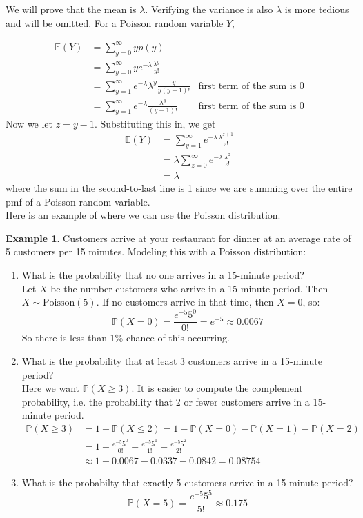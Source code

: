 \documentclass[12pt]{article}
\theoremstyle{definition}
\newtheorem*{example}{Example}
\theoremstyle{remark}
\def\P{{\mathbb P}}
\def\E{{\mathbb E}}
\begin{document}
We will prove that the mean is $\lambda$. Verifying the variance is also $\lambda$ is more tedious and will be omitted. For a Poisson random variable $Y$,

\begin{align*}
\E(Y) &= \sum_{y=0}^\infty y p(y) \\
&= \sum_{y=0}^\infty y e^{-\lambda}\frac{\lambda^y}{y!} \\
&= \sum_{y=1}^\infty e^{-\lambda}\lambda^y\frac{y}{y(y-1)!} & \text{first term of the sum is 0} \\
&= \sum_{y=1}^\infty e^{-\lambda} \frac{\lambda^y}{(y-1)!} & \text{first term of the sum is 0}
\end{align*}
Now we let $z = y - 1$. Substituting this in, we get
\begin{align*}
\E(Y) &= \sum_{y=1}^\infty e^{-\lambda} \frac{\lambda^{z+1}}{z!}\\
&= \lambda \sum_{z=0}^\infty e^{-\lambda} \frac{\lambda^{z}}{z!}\\
&= \lambda
\end{align*}
where the sum in the second-to-last line is 1 since we are summing over the entire pmf of a Poisson random variable.\\

Here is an example of where we can use the Poisson distribution.

\begin{example}Customers arrive at your restaurant for dinner at an average rate of 5 customers per 15 minutes. Modeling this with a Poisson distribution:
\begin{enumerate}
\item What is the probability that no one arrives in a 15-minute period?\\

Let $X$ be the number customers who arrive in a 15-minute period. Then $X\sim\text{Poisson}(5)$. If no customers arrive in that time, then $X=0$, so:
\[
\P(X = 0) = \frac{e^{-5}5^0}{0!} = e^{-5} \approx 0.0067
\]
So there is less than 1\% chance of this occurring.

\item What is the probability that at least 3 customers arrive in a 15-minute period?\\

Here we want $\P(X \geq 3)$. It is easier to compute the complement probability, i.e. the probability that 2 or fewer customers arrive in a 15-minute period.
\begin{align*}
\P(X \geq 3) &= 1 - \P(X \leq 2) = 1 - \P(X = 0) - \P(X = 1) - \P(X = 2) \\
&= 1 - \frac{e^{-5}5^0}{0!} - \frac{e^{-5}5^1}{1!} - \frac{e^{-5}5^2}{2!} \\
&\approx 1 - 0.0067 - 0.0337 - 0.0842 = 0.08754
\end{align*}

\item What is the probabilty that exactly 5 customers arrive in a 15-minute period?\\

\[
\P(X = 5) = \frac{e^{-5}5^5}{5!} \approx 0.175
\]

\end{enumerate}
\end{example}
\end{document}
